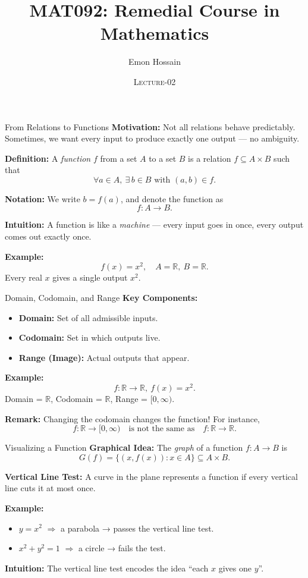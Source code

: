 \documentclass[11pt]{beamer}
\author[] %
{Emon Hossain\inst{1}}
\institute[University of Dhaka] %
{
  \inst{1}%
  Lecturer\\MNS department\\Brac University
}
\date[] %
{\textsc{Lecture-02}}
\title[]{MAT092: Remedial Course in Mathematics}
\theoremstyle{plain}
\begin{document}
\begin{frame}
\titlepage
\end{frame}

\begin{frame}{From Relations to Functions}
\textbf{Motivation:}  
Not all relations behave predictably. Sometimes, we want every input to produce exactly one output — no ambiguity.

\medskip
\textbf{Definition:}  
A \emph{function} $f$ from a set $A$ to a set $B$ is a relation $f \subseteq A \times B$ such that  
\[
\forall a \in A, \ \exists \, b \in B \text{ with } (a,b) \in f.
\]

\textbf{Notation:}  
We write $b = f(a)$, and denote the function as
\[
f: A \to B.
\]

\medskip
\textbf{Intuition:}  
A function is like a \emph{machine} — every input goes in once, every output comes out exactly once.

\medskip
\textbf{Example:}
\[
f(x) = x^2, \quad A = \mathbb{R}, \ B = \mathbb{R}.
\]
Every real $x$ gives a single output $x^2$.
\end{frame}


\begin{frame}{Domain, Codomain, and Range}
\textbf{Key Components:}
\begin{itemize}
    \item \textbf{Domain:} Set of all admissible inputs.
    \item \textbf{Codomain:} Set in which outputs live.
    \item \textbf{Range (Image):} Actual outputs that appear.
\end{itemize}

\textbf{Example:}
\[
f: \mathbb{R} \to \mathbb{R}, \ f(x) = x^2.
\]
Domain = $\mathbb{R}$, Codomain = $\mathbb{R}$,  
Range = $[0, \infty)$.

\medskip
\textbf{Remark:}  
Changing the codomain changes the function!  
For instance,  
\[
f: \mathbb{R} \to [0,\infty) \quad \text{is not the same as} \quad f: \mathbb{R} \to \mathbb{R}.
\]
\end{frame}

\begin{frame}{Visualizing a Function}
\textbf{Graphical Idea:}  
The \emph{graph} of a function $f: A \to B$ is
\[
G(f) = \{(x,f(x)) : x \in A\} \subseteq A \times B.
\]

\textbf{Vertical Line Test:}  
A curve in the plane represents a function if every vertical line cuts it at most once.

\medskip
\textbf{Example:}
\begin{itemize}
    \item $y = x^2$ $\Rightarrow$ a parabola → passes the vertical line test.
    \item $x^2 + y^2 = 1$ $\Rightarrow$ a circle → fails the test.
\end{itemize}

\textbf{Intuition:}  
The vertical line test encodes the idea “each $x$ gives one $y$”.
\end{frame}
\end{document}
